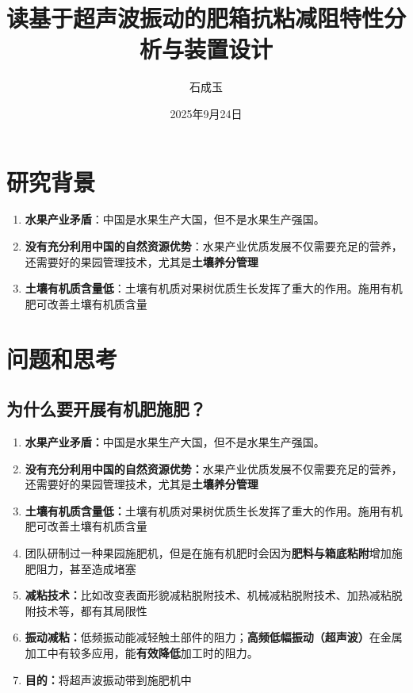 \documentclass[a4paper,12pt,fontset=none,titlepage]{ctexart}
\begin{document}
\author{石成玉}
\title{读基于超声波振动的肥箱抗粘减阻特性分析与装置设计}
\date{2025年9月24日}

\maketitle
\tableofcontents

\section{研究背景}

\begin{enumerate}
	\item \textbf{水果产业矛盾}：中国是水果生产大国，但不是水果生产强国。
	\item \textbf{没有充分利用中国的自然资源优势}：水果产业优质发展不仅需要充足的营养，还需要好的果园管理技术，尤其是\textbf{土壤养分管理}
	\item \textbf{土壤有机质含量低}：土壤有机质对果树优质生长发挥了重大的作用。施用有机肥可改善土壤有机质含量
\end{enumerate}

\section{问题和思考}

\subsection{为什么要开展有机肥施肥？}

\begin{enumerate}
	\item \textbf{水果产业矛盾：}中国是水果生产大国，但不是水果生产强国。
	\item \textbf{没有充分利用中国的自然资源优势：}水果产业优质发展不仅需要充足的营养，还需要好的果园管理技术，尤其是\textbf{土壤养分管理}
	\item \textbf{土壤有机质含量低：}土壤有机质对果树优质生长发挥了重大的作用。施用有机肥可改善土壤有机质含量
	\item 团队研制过一种果园施肥机，但是在施有机肥时会因为\textbf{肥料与箱底粘附}增加施肥阻力，甚至造成堵塞
	\item \textbf{减粘技术：}比如改变表面形貌减粘脱附技术、机械减粘脱附技术、加热减粘脱附技术等，都有其局限性
	\item \textbf{振动减粘：}低频振动能减轻触土部件的阻力；\textbf{高频低幅振动（超声波）}在金属加工中有较多应用，能\textbf{有效降低}加工时的阻力。
	\item \textbf{目的：}将超声波振动带到施肥机中
\end{enumerate}
\end{document}
